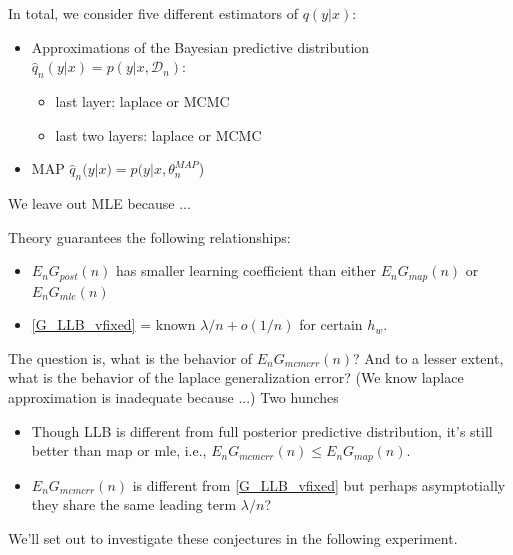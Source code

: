 \documentclass{article} %
\begin{document}
In total, we consider five different estimators of $q(y|x)$:
\begin{itemize}
    \item Approximations of the Bayesian predictive distribution $\hat q_n(y|x) = p(y|x,\mathcal D_n)$:
    \begin{itemize}
        \item last layer: laplace or MCMC
        \item last two layers: laplace or MCMC
    \end{itemize}
    \item MAP $\hat q_n(y|x) = p(y|x,\theta_n^{MAP}$)
\end{itemize}
We leave out MLE because ...






Theory guarantees the following relationships:
\begin{itemize}
    \item $E_n G_{post}(n)$ has smaller learning coefficient than either $E_n G_{map}(n)$ or $E_n G_{mle}(n)$
    \item \eqref{G_LLB_vfixed} = known $\lambda/n + o(1/n)$ for certain $h_w$. 
\end{itemize}

The question is, what is the behavior of $E_n G_{mcmcrr}(n)$? And to a lesser extent, what is the behavior of the laplace generalization error? (We know laplace approximation is inadequate because ...) Two hunches
\begin{itemize}
\item Though LLB is different from full posterior predictive distribution, it's still better than map or mle, i.e., $E_n G_{mcmcrr}(n) \le E_n G_{map}(n)$.
\item $E_n G_{mcmcrr}(n)$ is different from \eqref{G_LLB_vfixed} but perhaps asymptotially they share the same leading term $\lambda/n$?
\end{itemize}
We'll set out to investigate these conjectures in the following experiment.
\end{document}
